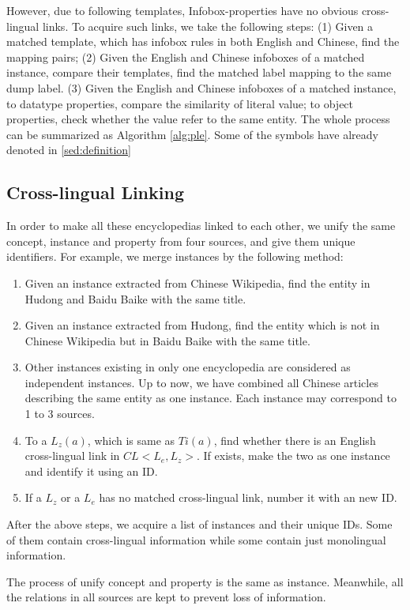 \documentclass[runningheads,a4paper]{llncs}
\begin{document}
However, due to following templates, Infobox-properties have no obvious cross-lingual links. To acquire such links, we take the following steps: (1) Given a matched template, which has infobox rules in both English and Chinese, find the mapping pairs; (2) Given the English and Chinese infoboxes of a matched instance, compare their templates, find the matched label mapping to the same dump label. (3) Given the English and Chinese infoboxes of a matched instance, to datatype properties, compare the similarity of literal value; to object properties, check whether the value refer to the same entity. The whole process can be summarized as Algorithm \ref{alg:ple}. Some of the symbols have already denoted in \ref{sed:definition}
\subsection{Cross-lingual Linking}
In order to make all these encyclopedias linked to each other, we unify the same concept, instance and property from four sources, and give them unique identifiers. For example, we merge instances by the following method:

\begin{enumerate}[1)]
    \item Given an instance extracted from Chinese Wikipedia, find the entity in Hudong and Baidu Baike with the same title.
    \item Given an instance extracted from Hudong, find the entity which is not in Chinese Wikipedia but in Baidu Baike with the same title.
    \item Other instances existing in only one encyclopedia are considered as independent instances. Up to now, we have combined all Chinese articles describing the same entity as one instance. Each instance may correspond to 1 to 3 sources.
    \item To a $L_{z}(a)$, which is same as $Ti(a)$, find whether there is an English cross-lingual link in $CL<L_{e}, L_{z}>$. If exists, make the two as one instance and identify it using an ID.
    \item If a $L_{z}$ or a $L_{e}$ has no matched cross-lingual link, number it with an new ID.
\end{enumerate}

After the above steps, we acquire a list of instances and their unique IDs. Some of them contain cross-lingual information while some contain just monolingual information.

The process of unify concept and property is the same as instance. Meanwhile, all the relations in all sources are kept to prevent loss of information.
\end{document}
